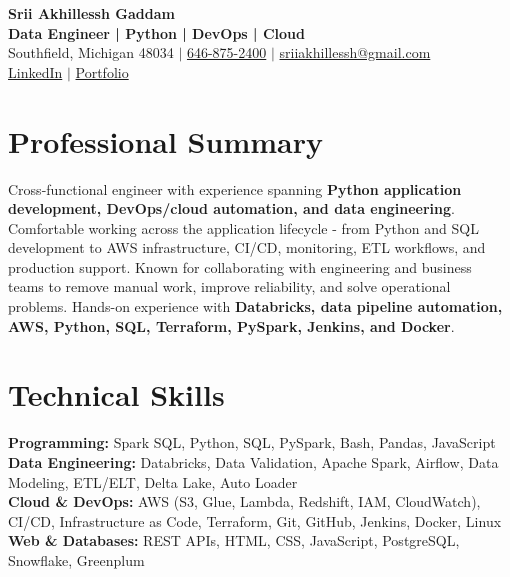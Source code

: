 \documentclass[letterpaper,10pt]{article}
\begin{document}
\fontsize{9.35pt}{10.45pt}\selectfont

\begin{center}
    {\LARGE \textbf{Srii Akhillessh Gaddam}} \\[-1pt]
    \textbf{Data Engineer | Python | DevOps | Cloud} \\[2pt]
    Southfield, Michigan 48034 $|$
    \href{tel:6468752400}{646-875-2400} $|$
    \href{mailto:sriiakhillessh@gmail.com}{sriiakhillessh@gmail.com} \\[1pt]
    \href{https://www.linkedin.com/in/srii-akhiilessh-gaddam-b48668191/}{LinkedIn} $|$
    \href{https://sriiakhillesshg.github.io/portfolio/}{Portfolio}
\end{center}
\vspace{-8pt}

\section{Professional Summary}
\small{Cross-functional engineer with experience spanning \textbf{Python application development, DevOps/cloud automation, and data engineering}. Comfortable working across the application lifecycle - from Python and SQL development to AWS infrastructure, CI/CD, monitoring, ETL workflows, and production support. Known for collaborating with engineering and business teams to remove manual work, improve reliability, and solve operational problems. Hands-on experience with \textbf{Databricks, data pipeline automation, AWS, Python, SQL, Terraform, PySpark, Jenkins, and Docker}.}

\section{Technical Skills}
\small{
\textbf{Programming:} Spark SQL, Python, SQL, PySpark, Bash, Pandas, JavaScript \\
\textbf{Data Engineering:} Databricks, Data Validation, Apache Spark, Airflow, Data Modeling, ETL/ELT, Delta Lake, Auto Loader \\
\textbf{Cloud \& DevOps:} AWS (S3, Glue, Lambda, Redshift, IAM, CloudWatch), CI/CD, Infrastructure as Code, Terraform, Git, GitHub, Jenkins, Docker, Linux \\
\textbf{Web \& Databases:} REST APIs, HTML, CSS, JavaScript, PostgreSQL, Snowflake, Greenplum
}
\end{document}
